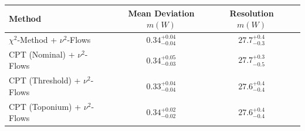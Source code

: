     \begin{tabular}{lccc}
        \toprule
        Method & Mean Deviation $m(W)$ & Resolution $m(W)$ \\
        \midrule
        $\chi^2$-Method + $\nu^2$-Flows & $0.34^{+0.04}_{-0.04}$ & $27.7^{+0.4}_{-0.3}$ \\
        CPT (Nominal) + $\nu^2$-Flows & $0.34^{+0.05}_{-0.03}$ & $27.7^{+0.3}_{-0.5}$ \\
        CPT (Threshold) + $\nu^2$-Flows & $0.33^{+0.04}_{-0.04}$ & $27.6^{+0.4}_{-0.4}$ \\
        CPT (Toponium) + $\nu^2$-Flows & $0.34^{+0.02}_{-0.02}$ & $27.6^{+0.4}_{-0.4}$ \\
        \bottomrule
    \end{tabular}